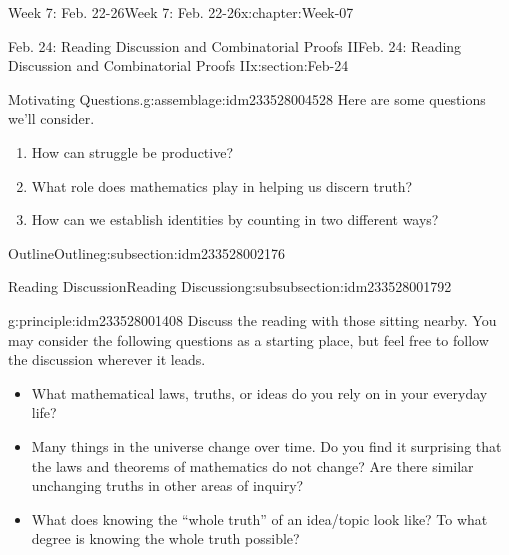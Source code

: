 \documentclass[oneside,10pt,]{book}
\numberwithin{equation}{section}
\begin{document}
\begin{chapterptx}{Week 7: Feb. 22-26}{}{Week 7: Feb. 22-26}{}{}{x:chapter:Week-07}
%
%
\typeout{************************************************}
\typeout{************************************************}
%
\begin{sectionptx}{Feb. 24: Reading Discussion and Combinatorial Proofs II}{}{Feb. 24: Reading Discussion and Combinatorial Proofs II}{}{}{x:section:Feb-24}
\begin{introduction}{}%
\begin{assemblage}{Motivating Questions.}{g:assemblage:idm233528004528}%
Here are some questions we'll consider. %
\begin{enumerate}
\item{}How can struggle be productive?%
\item{}What role does mathematics play in helping us discern truth?%
\item{}How can we establish identities by counting in two different ways?%
\end{enumerate}
%
\end{assemblage}
\end{introduction}%
%
%
\typeout{************************************************}
\typeout{************************************************}
%
\begin{subsectionptx}{Outline}{}{Outline}{}{}{g:subsection:idm233528002176}
%
%
\typeout{************************************************}
\typeout{************************************************}
%
\begin{subsubsectionptx}{Reading Discussion}{}{Reading Discussion}{}{}{g:subsubsection:idm233528001792}
\begin{principle}{}{}{g:principle:idm233528001408}%
Discuss the reading with those sitting nearby. You may consider the following questions as a starting place, but feel free to follow the discussion wherever it leads.%
%
\begin{itemize}[label=\textbullet]
\item{}What mathematical laws, truths, or ideas do you rely on in your everyday life?%
\item{}Many things in the universe change over time. Do you find it surprising that the laws and theorems of mathematics do not change? Are there similar unchanging truths in other areas of inquiry?%
\item{}What does knowing the ``whole truth'' of an idea\slash{}topic look like? To what degree is knowing the whole truth possible?%

\end{itemize}
\end{principle}
\end{subsubsectionptx}
\end{subsectionptx}
\end{sectionptx}
\end{chapterptx}
\end{document}
